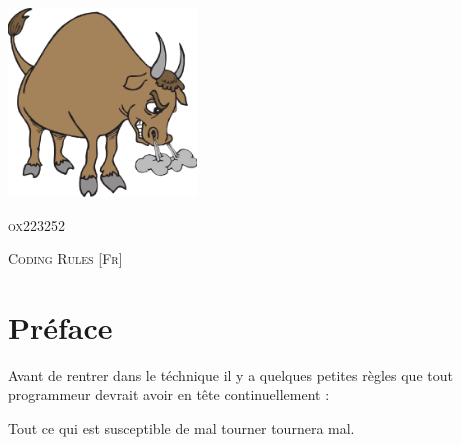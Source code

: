 \documentclass{report}
\newenvironment{extrait}[1]{\small\slshape
\savebox{\auteurbm}{\upshape\sffamily#1}
\begin{flushright}}{\\[4pt]\usebox{\auteurbm}
\end{flushright}\normalsize\upshape}
\begin{document}
	\begin{titlepage}
		\begin{minipage}{0.4\textwidth}
			\begin{flushleft}
				\includegraphics[height=5cm]{res/imgs/ox}
			\end{flushleft}
		\end{minipage}
		\begin{minipage}{0.4\textwidth}
			\begin{flushright}
				\begin{flushright}
					\textsc{ox223252}
				\end{flushright}
			\end{flushright}
		\end{minipage}
		\vfill
			\center\large\textsc{Coding Rules}
			\center\textsc{[Fr]}
		\vfill
		\begin{minipage}{0.4\textwidth}
			\begin{flushleft} \large
			\end{flushleft}
		\end{minipage}
		\begin{minipage}{0.4\textwidth}
			\begin{flushright}
			\end{flushright}
		\end{minipage}
	\end{titlepage}

	\tableofcontents
	\listoffigures

	\newpage
	\setcounter{page}{1}

	\chapter{Préface}
		Avant de rentrer dans le téchnique il y a quelques petites règles que tout programmeur devrait avoir en tête continuellement :

		\begin{extrait}{Murphy}
			Tout ce qui est susceptible de mal tourner tournera mal.
		\end{extrait}
\end{document}
